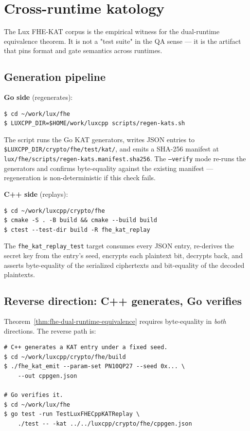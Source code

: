 \section{Cross-runtime katology}
\label{sec:cross-runtime-katology}

The Lux FHE-KAT corpus is the empirical witness for the dual-runtime
equivalence theorem. It is not a "test suite" in the QA sense ---
it is the artifact that pins format and gate semantics across runtimes.

\subsection{Generation pipeline}

\textbf{Go side} (regenerates):

\begin{lstlisting}
$ cd ~/work/lux/fhe
$ LUXCPP_DIR=$HOME/work/luxcpp scripts/regen-kats.sh
\end{lstlisting}

The script runs the Go KAT generators, writes JSON entries to
\texttt{\$LUXCPP\_DIR/crypto/fhe/test/kat/}, and emits a SHA-256
manifest at \texttt{lux/fhe/scripts/regen-kats.manifest.sha256}. The
\texttt{--verify} mode re-runs the generators and confirms byte-equality
against the existing manifest --- regeneration is non-deterministic if
this check fails.

\textbf{C++ side} (replays):

\begin{lstlisting}
$ cd ~/work/luxcpp/crypto/fhe
$ cmake -S . -B build && cmake --build build
$ ctest --test-dir build -R fhe_kat_replay
\end{lstlisting}

The \texttt{fhe\_kat\_replay\_test} target consumes every JSON entry,
re-derives the secret key from the entry's seed, encrypts each
plaintext bit, decrypts back, and asserts byte-equality of the
serialized ciphertexts and bit-equality of the decoded plaintexts.

\subsection{Reverse direction: C++ generates, Go verifies}

Theorem~\ref{thm:fhe-dual-runtime-equivalence} requires byte-equality
in \emph{both} directions. The reverse path is:

\begin{lstlisting}
# C++ generates a KAT entry under a fixed seed.
$ cd ~/work/luxcpp/crypto/fhe/build
$ ./fhe_kat_emit --param-set PN10QP27 --seed 0x... \
    --out cppgen.json

# Go verifies it.
$ cd ~/work/lux/fhe
$ go test -run TestLuxFHECppKATReplay \
    ./test -- -kat ../../luxcpp/crypto/fhe/cppgen.json
\end{lstlisting}

